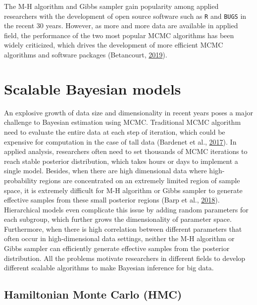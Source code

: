 \documentclass[12pt]{book}
\numberwithin{equation}{chapter}
\begin{document}
The M-H algorithm and Gibbs sampler gain popularity among applied researchers with the development of open source software such as \texttt{R} and \texttt{BUGS} in the recent 30 years. However, as more and more data are available in applied field, the performance of the two most popular MCMC algorithms has been widely criticized, which drives the development of more efficient MCMC algorithms and software packages (Betancourt, \protect\hyperlink{ref-betancourt2019convergence}{2019}).

\hypertarget{scalable-bayesian-models}{%
\section{Scalable Bayesian models}\label{scalable-bayesian-models}}

An explosive growth of data size and dimensionality in recent years poses a major challenge to Bayesian estimation using MCMC. Traditional MCMC algorithm need to evaluate the entire data at each step of iteration, which could be expensive for computation in the case of tall data (Bardenet et al., \protect\hyperlink{ref-bardenet2017markov}{2017}). In applied analysis, researchers often need to set thousands of MCMC iterations to reach stable posterior distribution, which takes hours or days to implement a single model. Besides, when there are high dimensional data where high-probability regions are concentrated on an extremely limited region of sample space, it is extremely difficult for M-H algorithm or Gibbs sampler to generate effective samples from these small posterior regions (Barp et al., \protect\hyperlink{ref-barp2018geometry}{2018}). Hierarchical models even complicate this issue by adding random parameters for each subgroup, which further grows the dimensionality of parameter space. Furthermore, when there is high correlation between different parameters that often occur in high-dimensional data settings, neither the M-H algorithm or Gibbs sampler can efficiently generate effective samples from the posterior distribution. All the problems motivate researchers in different fields to develop different scalable algorithms to make Bayesian inference for big data.

\hypertarget{hamiltonian-monte-carlo-hmc}{%
\subsection{Hamiltonian Monte Carlo (HMC)}\label{hamiltonian-monte-carlo-hmc}}
\end{document}
